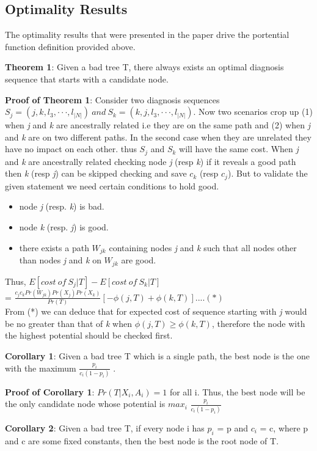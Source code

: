 \documentclass[10pt]{sigplan-proc-varsize}
\begin{document}
\subsection{Optimality Results}
The optimality results that were presented in the paper drive the portential function definition provided above. 

{\bf Theorem 1}: Given a bad tree T, there always exists an optimal diagnosis sequence that starts with a candidate node.

{\bf Proof of Theorem 1}: Consider two diagnosis sequences $S_j = (j,k,l_3,···,l_{|N|})\ and\ S_k = (k, j, l_3, · · · , l_{|N|})$. Now two scenarios crop up (1) when {\it j} and {\it k} are ancestrally related i.e they are on the same path and (2) when {\it j} and {\it k} are on two different paths.  In the second case when they are unrelated they have no impact on each other. thus $S_j$ and $S_k$ will have the same cost.  When  {\it j} and {\it k} are ancestrally related checking node {\it j} (resp {\it k}) if it reveals a good path then {\it k} (resp {\it j}) can be skipped checking and save $c_k$ (resp $c_j$). But to validate the given statement we need certain conditions to hold good.
\begin{itemize}
  \item node {\it j} (resp. {\it k}) is bad.
  \item node {\it k} (resp. {\it j}) is good.
  \item there exists a path $W_{jk}$ containing nodes {\it j} and {\it k} such that all nodes other than nodes {\it j} and {\it k} on $W_{jk}$ are good.
\end{itemize} Thus,
$E[cost\ of\ S_j|T ] - E[cost\ of\ S_k|T ]$ \\
 = $\frac{c_jc_kPr(W_{jk})Pr(X_j)Pr(X_k)}{Pr(T)}[-\phi(j,T)+\phi(k,T)] .... (*)$\\
From (*) we can deduce that for expected cost of sequence starting with {\it j}  would be no greater than that of {\it k} when  $\phi(j,T) \geq \phi(k,T)$, therefore the node with the highest potential should be checked first.

{\bf Corollary 1}: Given a bad tree T which is a single path, the best node is the one with the maximum $\frac{p_i}{c_i(1-p_i)}$ .

{\bf Proof of Corollary 1}:  $Pr(T |X_i,A_i) = 1$ for all i. Thus, the best node will be
the only candidate node whose potential is $max_i$ $\frac{p_i}{c_i(1-p_i)}$

{\bf Corollary 2}: Given a bad tree T, if every node i has $p_i$ = p and $c_i$ = c, where p and c are some fixed constants, then the best node is the root node of T.
\end{document}
